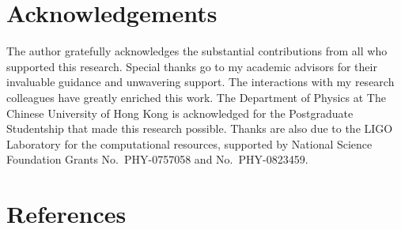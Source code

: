 \documentclass[10pt,a4paper,onecolumn]{article}
\let\textttOrig=\texttt
\def\texttt#1{\expandafter\textttOrig{\seqsplit{#1}}}
\let\addcontentslineOrig=\addcontentsline
\def\addcontentsline#1#2#3{\bgroup
  \let\texttt=\textttOrig\addcontentslineOrig{#1}{#2}{#3}\egroup}
\begin{document}
\section{Acknowledgements}\label{acknowledgements}

The author gratefully acknowledges the substantial contributions from
all who supported this research. Special thanks go to my academic
advisors for their invaluable guidance and unwavering support. The
interactions with my research colleagues have greatly enriched this
work. The Department of Physics at The Chinese University of Hong Kong
is acknowledged for the Postgraduate Studentship that made this research
possible. Thanks are also due to the LIGO Laboratory for the
computational resources, supported by National Science Foundation Grants
No.~PHY-0757058 and No.~PHY-0823459.

\section*{References}\label{references}
\end{document}
